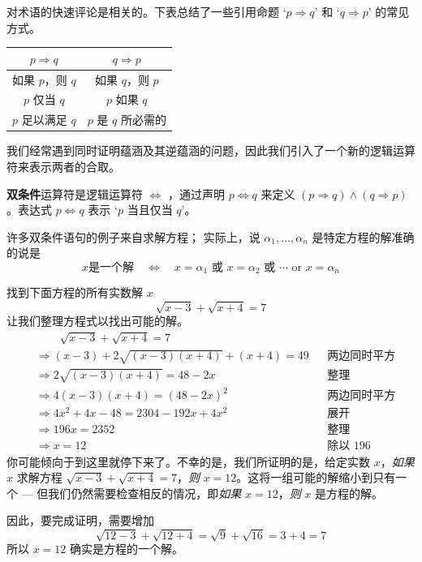 对术语的快速评论是相关的。下表总结了一些引用命题 `$p \Rightarrow q$' 和 `$q \Rightarrow p$' 的常见方式。

\begin{center}
\begin{tabular}{c|c}
$p \Rightarrow q$ & $q \Rightarrow p$ \\ \hline
如果 $p$，则 $q$ & 如果 $q$，则 $p$ \\
$p$ 仅当 $q$ & $p$ 如果 $q$ \\
$p$ 足以满足 $q$ & $p$ 是 $q$ 所必需的
\end{tabular}
\end{center}

我们经常遇到同时证明蕴涵及其逆蕴涵的问题，因此我们引入了一个新的逻辑运算符来表示两者的合取。

\begin{definition}
\label{defBiconditional}
\textbf{双条件}运算符是逻辑运算符 $\Leftrightarrow$ ，通过声明 $p \Leftrightarrow q$ 来定义 $(p \Rightarrow q) \wedge (q \Rightarrow p)$。表达式 $p \Leftrightarrow q$ 表示 `$p$ 当且仅当 $q$'。
\end{definition}

许多双条件语句的例子来自求解方程； 实际上，说 $\alpha_1,\dots,\alpha_n$ 是特定方程的解准确的说是
\[
x \text{是一个解} \quad \Leftrightarrow \quad x = \alpha_1 \text{ 或 } x = \alpha_2 \text{ 或 } \cdots \text{ or } x = \alpha_n
\]

\begin{example}
\label{exSolveSqrtFirstExample}
找到下面方程的所有实数解 $x$
\[
\sqrt{x-3} + \sqrt{x+4} = 7
\]
让我们整理方程式以找出可能的解。
\begin{align*}
&\phantom{\Rightarrow\;\;} \sqrt{x-3} + \sqrt{x+4} = 7 && \\
&\Rightarrow (x-3) + 2\sqrt{(x-3)(x+4)} + (x+4) = 49 && \text{两边同时平方} \\
&\Rightarrow 2\sqrt{(x-3)(x+4)} = 48-2x && \text{整理} \\
&\Rightarrow 4(x-3)(x+4) = (48-2x)^2 && \text{两边同时平方} \\
&\Rightarrow 4x^2+4x-48 = 2304-192x+4x^2 && \text{展开} \\
&\Rightarrow 196x = 2352 && \text{整理} \\
&\Rightarrow x=12 && \text{除以 $196$}
\end{align*}
你可能倾向于到这里就停下来了。不幸的是，我们所证明的是，给定实数 $x$，\textit{如果} $x$ 求解方程 $\sqrt{x-3} + \sqrt{x+4} = 7$，\textit{则} $x=12$。这将一组可能的解缩小到只有一个 --- 但我们仍然需要检查相反的情况，即\textit{如果} $x=12$，\textit{则} $x$ 是方程的解。

因此，要完成证明，需要增加
\[
\sqrt{12-3} + \sqrt{12+4} = \sqrt{9} + \sqrt{16} = 3 + 4 = 7
\]
所以 $x=12$ 确实是方程的一个解。
\end{example}

